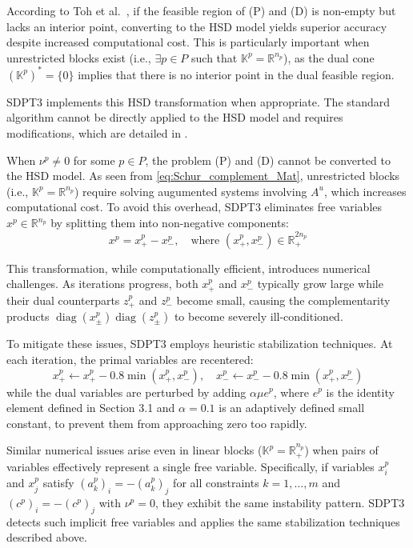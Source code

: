 According to Toh et al.~\cite{toh1999}, if the feasible region of (P) and (D) is non-empty but lacks an interior point, converting to the HSD model yields superior accuracy despite increased computational cost.
This is particularly important when unrestricted blocks exist (i.e., $\exists p\in P$ such that $\mathbb{K}^p=\mathbb{R}^{n_p}$), as the dual cone $(\mathbb{K}^p)^*=\{0\}$ implies that there is no interior point in the dual feasible region.

SDPT3 implements this HSD transformation when appropriate.
The standard algorithm cannot be directly applied to the HSD model and requires modifications, which are detailed in \cite{toh1999}.

\medskip

When $\nu^p \neq 0$ for some $p \in P$, the problem (P) and (D) cannot be converted to the HSD model.
As seen from \eqref{eq:Schur_complement_Mat}, unrestricted blocks (i.e., $\mathbb{K}^p = \mathbb{R}^{n_p}$) require solving augumented systems involving $A^u$, which increases computational cost.
To avoid this overhead, SDPT3 eliminates free variables $x^p \in \mathbb{R}^{n_p}$ by splitting them into non-negative components:
\[
   x^p = x^p_+ - x^p_-, \quad \text{where } (x^p_+, x^p_-) \in \mathbb{R}^{2n_p}_+
\]

This transformation, while computationally efficient, introduces numerical challenges.
As iterations progress, both $x^p_+$ and $x^p_-$ typically grow large while their dual counterparts $z^p_+$ and $z^p_-$ become small, causing the complementarity products $\operatorname{diag}(x^p_\pm) \operatorname{diag}(z^p_\pm)$ to become severely ill-conditioned.

To mitigate these issues, SDPT3 employs heuristic stabilization techniques.
At each iteration, the primal variables are recentered:
\[
   x^p_+ \leftarrow x^p_+ - 0.8 \min(x^p_+, x^p_-), \quad
   x^p_- \leftarrow x^p_- - 0.8 \min(x^p_+, x^p_-)
\]
while the dual variables are perturbed by adding $\alpha \mu e^p$, where $e^p$ is the identity element defined in Section 3.1 and $\alpha = 0.1$ is an adaptively defined small constant, to prevent them from approaching zero too rapidly.

\medskip

Similar numerical issues arise even in linear blocks ($\mathbb{K}^p=\mathbb{R}^{n_p}_+$) when pairs of variables effectively represent a single free variable.
Specifically, if variables $x^p_i$ and $x^p_j$ satisfy $(a^p_k)_i = -(a^p_k)_j$ for all constraints $k=1,\ldots,m$ and $(c^p)_i = -(c^p)_j$ with $\nu^p = 0$, they exhibit the same instability pattern.
SDPT3 detects such implicit free variables and applies the same stabilization techniques described above.



